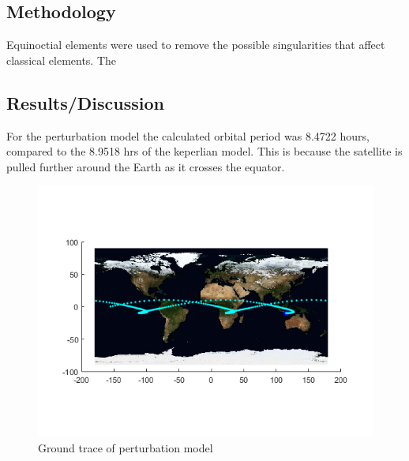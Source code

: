 \documentclass[Space3_Assign1.tex]{subfiles}
\begin{document}
\subsection{Methodology}
Equinoctial elements were used to remove the possible singularities that affect classical elements. The 



\subsection{Results/Discussion}
For the perturbation model the calculated orbital period was 8.4722 hours, compared to the 8.9518 hrs of the keperlian model. This is because the satellite is pulled further around the Earth as it crosses the equator. 

\begin{figure}[h!]
\centering
\includegraphics[width=1\linewidth]{Q2_gnd}
\caption{Ground trace of perturbation model}
\label{fig:Q2_gnd}
\end{figure}
\end{document}
